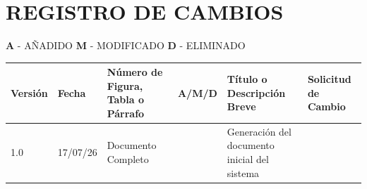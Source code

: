 ﻿\section*{REGISTRO DE CAMBIOS}
\noindent \textbf{A} - AÑADIDO \hspace{1cm} \textbf{M} - MODIFICADO \hspace{1cm} \textbf{D} - ELIMINADO

\begin{longtable}{|p{2cm}|p{2.5cm}|p{3.5cm}|p{1.5cm}|p{4cm}|p{2.5cm}|}
\hline
\textbf{Versión} & \textbf{Fecha} & \textbf{Número de Figura, Tabla o Párrafo} & \textbf{A/M/D} & \textbf{Título o Descripción Breve} & \textbf{Solicitud de Cambio} \\
\hline
1.0 & 17/07/26 & Documento Completo & & Generación del documento inicial del sistema & \\
\hline
\end{longtable}
